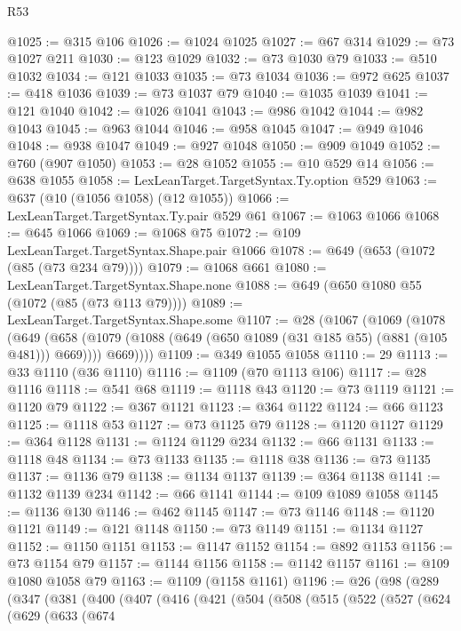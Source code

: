 \begin{lexlean}{R53}
\begin{coremodule}
@1025 := @315 @106
@1026 := @1024 @1025
@1027 := @67 @314
@1029 := @73 @1027 @211
@1030 := @123 @1029
@1032 := @73 @1030 @79
@1033 := @510 @1032
@1034 := @121 @1033
@1035 := @73 @1034
@1036 := @972 @625
@1037 := @418 @1036
@1039 := @73 @1037 @79
@1040 := @1035 @1039
@1041 := @121 @1040
@1042 := @1026 @1041
@1043 := @986 @1042
@1044 := @982 @1043
@1045 := @963 @1044
@1046 := @958 @1045
@1047 := @949 @1046
@1048 := @938 @1047
@1049 := @927 @1048
@1050 := @909 @1049
@1052 := @760 (@907 @1050)
@1053 := @28 @1052
@1055 := @10 @529 @14
@1056 := @638 @1055
@1058 := LexLeanTarget.TargetSyntax.Ty.option @529
@1063 := @637 (@10 (@1056 @1058) (@12 @1055))
@1066 := LexLeanTarget.TargetSyntax.Ty.pair @529 @61
@1067 := @1063 @1066
@1068 := @645 @1066
@1069 := @1068 @75
@1072 := @109 LexLeanTarget.TargetSyntax.Shape.pair @1066
@1078 := @649 (@653 (@1072 (@85 (@73 @234 @79))))
@1079 := @1068 @661
@1080 := LexLeanTarget.TargetSyntax.Shape.none
@1088 := @649 (@650 @1080 @55 (@1072 (@85 (@73 @113 @79))))
@1089 := LexLeanTarget.TargetSyntax.Shape.some
@1107 := @28
    (@1067
      (@1069
        (@1078
          (@649
            (@658 (@1079 (@1088 (@649 (@650 @1089 (@31 @185 @55) (@881 (@105 @481))) @669))))
            @669))))
@1109 := @349 @1055 @1058
@1110 := 29
@1113 := @33 @1110 (@36 @1110)
@1116 := @1109 (@70 @1113 @106)
@1117 := @28 @1116
@1118 := @541 @68
@1119 := @1118 @43
@1120 := @73 @1119
@1121 := @1120 @79
@1122 := @367 @1121
@1123 := @364 @1122
@1124 := @66 @1123
@1125 := @1118 @53
@1127 := @73 @1125 @79
@1128 := @1120 @1127
@1129 := @364 @1128
@1131 := @1124 @1129 @234
@1132 := @66 @1131
@1133 := @1118 @48
@1134 := @73 @1133
@1135 := @1118 @38
@1136 := @73 @1135
@1137 := @1136 @79
@1138 := @1134 @1137
@1139 := @364 @1138
@1141 := @1132 @1139 @234
@1142 := @66 @1141
@1144 := @109 @1089 @1058
@1145 := @1136 @130
@1146 := @462 @1145
@1147 := @73 @1146
@1148 := @1120 @1121
@1149 := @121 @1148
@1150 := @73 @1149
@1151 := @1134 @1127
@1152 := @1150 @1151
@1153 := @1147 @1152
@1154 := @892 @1153
@1156 := @73 @1154 @79
@1157 := @1144 @1156
@1158 := @1142 @1157
@1161 := @109 @1080 @1058 @79
@1163 := @1109 (@1158 @1161)
@1196 := @26
    (@98
      (@289
        (@347
          (@381
            (@400
              (@407
                (@416
                  (@421
                    (@504
                      (@508
                        (@515
                          (@522
                            (@527
                              (@624
                                (@629
                                  (@633
                                    (@674

\end{coremodule}
\end{lexlean}
